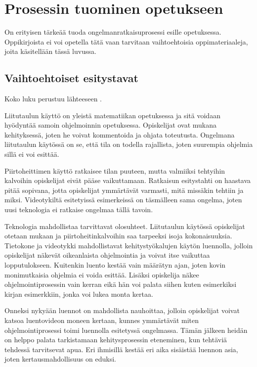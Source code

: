 \section{Prosessin tuominen opetukseen}

On erityisen tärkeää tuoda ongelmanratkaisuprosessi esille opetuksessa.
Oppikirjoista ei voi opetella tätä vaan tarvitaan vaihtoehtoisia
oppimateriaaleja, joita käsitellään tässä luvussa.

\subsection{Vaihtoehtoiset esitystavat}

Koko luku perustuu lähteeseen \cite{Bennedsen:2008}.

Liitutaulun käyttö on yleistä matematiikan opetuksessa ja sitä voidaan hyödyntää
samoin ohjelmoinnin opetuksessa. Opiskelijat ovat mukana kehityksessä, joten he
voivat kommentoida ja ohjata toteutusta. Ongelmana liitutaulun käytössä on se,
että tila on todella rajallista, joten suurempia ohjelmia sillä ei voi esittää.

Piirtoheittimen käyttö ratkaisee tilan puuteen, mutta valmiiksi tehtyihin
kalvoihin opiskelijat eivät pääse vaikuttamaan. Ratkaisun esitystahti on
haastava pitää sopivana, jotta opiskelijat ymmärtävät varmasti, mitä missäkin
tehtiin ja miksi. Videotykiltä esitetyissä esimerkeissä on täsmälleen sama
ongelma, joten uusi teknologia ei ratkaise ongelmaa tällä tavoin.

Teknologia mahdollistaa tarvittavat olosuhteet. Liitutaulun käytössä opiskelijat
otetaan mukaan ja piirtoheitinkalvoihin saa tarpeeksi isoja kokonaisuuksia.
Tietokone ja videotykki mahdollistavat kehitystyökalujen käytön luennolla,
jolloin opiskelijat näkevät oikeanlaista ohjelmointia ja voivat itse vaikuttaa
lopputulokseen. Kuitenkin luento kestää vain määrätyn ajan, joten kovin
monimutkaisia ohjelmia ei voida esittää. Lisäksi opiskelija näkee
ohjelmointiprosessin vain kerran eikä hän voi palata siihen kuten esimerkiksi
kirjan esimerkkiin, jonka voi lukea monta kertaa.

Onneksi nykyään luennot on mahdollista nauhoittaa, jolloin opiskelijat voivat
katsoa luentovideon moneen kertaan, kunnes ymmärtävät miten ohjelmointiprosessi
toimi luennolla esitetyssä ongelmassa. Tämän jälkeen heidän on helppo palata
tarkistamaan kehitysprosessin eteneminen, kun tehtäviä tehdessä tarvitsevat
apua. Eri ihmisillä kestää eri aika sisäistää luennon asia, joten
kertausmahdollisuus on eduksi.

